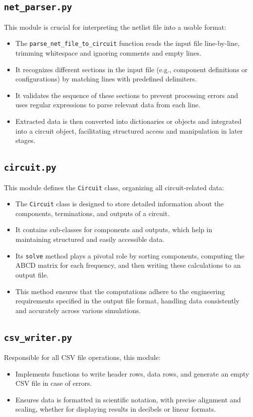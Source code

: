 \documentclass[conference]{IEEEtran}
\begin{document}
\subsection{\textbf{\texttt{net\_parser.py}}}
This module is crucial for interpreting the netlist file into a usable format:
\begin{itemize}
      \item The \texttt{parse\_net\_file\_to\_circuit} function reads the input file line-by-line, trimming whitespace and ignoring comments and empty lines.
      \item It recognizes different sections in the input file (e.g., component definitions or configurations) by matching lines with predefined delimiters.
      \item It validates the sequence of these sections to prevent processing errors and uses regular expressions to parse relevant data from each line.
      \item Extracted data is then converted into dictionaries or objects and integrated into a circuit object, facilitating structured access and manipulation in later stages.
\end{itemize}

\subsection{\textbf{\texttt{circuit.py}}}
This module defines the \texttt{Circuit} class, organizing all circuit-related data:
\begin{itemize}
      \item The \texttt{Circuit} class is designed to store detailed information about the components, terminations, and outputs of a circuit.
      \item It contains sub-classes for components and outputs, which help in maintaining structured and easily accessible data.
      \item Its \texttt{solve} method plays a pivotal role by sorting components, computing the ABCD matrix for each frequency, and then writing these calculations to an output file.
      \item This method ensures that the computations adhere to the engineering requirements specified in the output file format, handling data consistently and accurately across various simulations.
\end{itemize}

\subsection{\textbf{\texttt{csv\_writer.py}}}
Responsible for all CSV file operations, this module:
\begin{itemize}
      \item Implements functions to write header rows, data rows, and generate an empty CSV file in case of errors.
      \item Ensures data is formatted in scientific notation, with precise alignment and scaling, whether for displaying results in decibels or linear formats.
\end{itemize}
\end{document}
